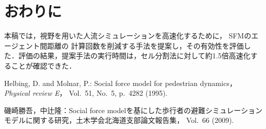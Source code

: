 \documentclass{maelab_y}
\begin{document}
\section{おわりに}
本稿では，視野を用いた人流シミュレーションを高速化するために，
SFMのエージェント間距離の
計算回数を削減する手法を提案し，その有効性を評価した．評価の結果，提案手法の実行時間は，セル分割法に対して約1.5倍高速化することが確認できた．

\begin{thebibliography}{9}
\footnotesize
{}
  Helbing, D. and Molnar, P.: Social force model for pedestrian dynamics，{\em
    Physical review E}， Vol.~51, No.~5, p.\ 4282 (1995).

  磯崎勝吾，中辻隆：Social force
  modelを基にした歩行者の避難シミュレーションモデルに関する研究，土木学会北海道支部論文報告集，
  Vol.~66 (2009).
\end{thebibliography}
\end{document}
